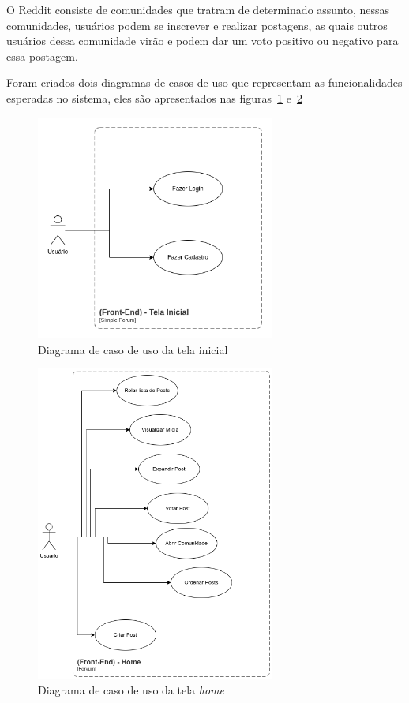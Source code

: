 \documentclass[12pt]{article}
\begin{document}
O Reddit consiste de comunidades que tratram de determinado assunto, nessas comunidades, usuários
podem se inscrever e realizar postagens, as quais outros usuários dessa comunidade virão e podem
dar um voto positivo ou negativo para essa postagem.

Foram criados dois diagramas de casos de uso que representam as funcionalidades esperadas no sistema,
eles são apresentados nas figuras~\ref{fig:welcome_diagram} e~\ref{fig:home_diagram}

\begin{figure}[H]
    \centering
    \includegraphics[width=0.7\textwidth]{diagrams/welcome_diagram.png}
    \caption{Diagrama de caso de uso da tela inicial}\label{fig:welcome_diagram}
\end{figure}

\begin{figure}[H]
    \centering
    \includegraphics[width=0.7\textwidth]{diagrams/home_diagram.png}
    \caption{Diagrama de caso de uso da tela \textit{home}}\label{fig:home_diagram}
\end{figure}
\end{document}
